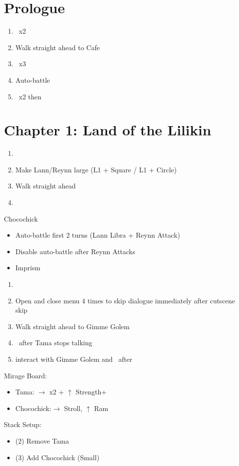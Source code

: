 \chapter{Prologue}
\begin{enumerate}
	\item \cs\ x2
	\item Walk straight ahead to Cafe
	\item \cs\ x3
	\item Auto-battle
	\item \cs\ x2 then
\end{enumerate}
\chapter{Chapter 1: Land of the Lilikin}
\begin{enumerate}
	\item \cs
	\item Make Lann/Reynn large (L1 + Square / L1 + Circle)
	\item Walk straight ahead
	\item \cs
\end{enumerate}
\begin{battle}[]{Chocochick}
	\begin{itemize}
		\item Auto-battle first 2 turns (Lann Libra + Reynn Attack)
		\item Disable auto-battle after Reynn Attacks
		\item Imprism
	\end{itemize}
\end{battle}
\begin{enumerate}[resume]
	\item \cs
	\item Open and close menu 4 times to skip dialogue immediately after cutscene skip
	\item Walk straight ahead to Gimme Golem
	\item \cs\ after Tama stops talking
	\item interact with Gimme Golem and \cs\ after
\end{enumerate}
\begin{menu}
	Mirage Board:
	\begin{itemize}
		\item Tama: $\rightarrow$ x2 + $\uparrow$ Strength+
		\item Chocochick:$\rightarrow$ Stroll, $\uparrow$ Ram
	\end{itemize}
	Stack Setup:
	\begin{itemize}
		\item (2) Remove Tama
		\item (3) Add Chocochick (Small)
	\end{itemize}
\end{menu}
